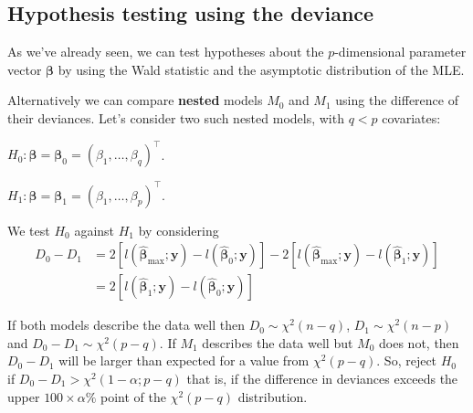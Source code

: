 \documentclass[
  a4paper,
  DIV=11,
  numbers=noendperiod]{scrreprt}
\providecommand{\tightlist}{%
  \setlength{\itemsep}{0pt}\setlength{\parskip}{0pt}}
\newcommand{\term}[1]{\textbf{#1}}
\begin{document}
\subsection{Hypothesis testing using the
deviance}\label{hypothesis-testing-using-the-deviance}

As we've already seen, we can test hypotheses about the
\(p\)-dimensional parameter vector \(\boldsymbol{\beta}\) by using the
Wald statistic and the asymptotic distribution of the MLE.

Alternatively we can compare \term{nested} models \(M_0\) and \(M_1\)
using the difference of their deviances. Let's consider two such nested
models, with \(q < p\) covariates:

\begin{description}
\tightlist
\item[Model \(M_0\)]
\(H_0: \boldsymbol{\beta}= \boldsymbol{\beta}_0 = (\beta_1, \dots, \beta_q)^\intercal\).
\item[Model \(M_1\)]
\(H_1: \boldsymbol{\beta} = \boldsymbol{\beta}_1=(\beta_1, \dots, \beta_p)^\intercal\).
\end{description}

We test \(H_0\) against \(H_1\) by considering \[
\begin{aligned}
D_0-D_1& =2\left[l(\hat{\boldsymbol{\beta}}_{\max}; \boldsymbol{y}) -l(\hat{\boldsymbol{\beta}}_0; \boldsymbol{y})\right]-2\left[l(\hat{\boldsymbol{\beta}}_{\max}; \boldsymbol{y}) -l(\hat{\boldsymbol{\beta}}_1; \boldsymbol{y})\right] \\
 &=2\left[ l(\hat{\boldsymbol{\beta}}_1; \boldsymbol{y}) -l(\hat{\boldsymbol{\beta}}_0; \boldsymbol{y})\right]
\end{aligned}
\]

If both models describe the data well then \(D_0 \sim \chi^2(n-q)\),
\(D_1 \sim \chi^2(n-p)\) and \(D_0-D_1 \sim \chi^2(p-q)\). If \(M_1\)
describes the data well but \(M_0\) does not, then \(D_0-D_1\) will be
larger than expected for a value from \(\chi^2(p-q)\). So, reject
\(H_0\) if \(D_0-D_1> \chi^2(1-\alpha; p-q)\) that is, if the difference
in deviances exceeds the upper \(100\times \alpha \%\) point of the
\(\chi^2(p-q)\) distribution.
\end{document}
